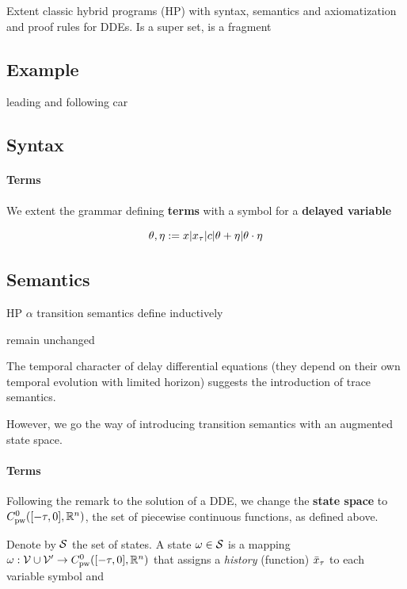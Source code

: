 \documentclass[10pt]{article}
\begin{document}
Extent classic hybrid programs (HP) with syntax, semantics and axiomatization and proof rules for DDEs. Is a super set, \dL is a fragment

\subsection{Example}\label{example-1}

leading and following car

\subsection{Syntax}\label{syntax}

\paragraph{Terms}\label{terms}

We extent the grammar defining \textbf{terms} with a symbol for a \textbf{delayed variable}

\begin{equation} \theta,\eta := x|x_{\tau}|c|\theta+\eta|\theta\cdot\eta \end{equation}

\subsection{Semantics}\label{semantics}

HP $\alpha$ transition semantics define inductively

remain unchanged

The temporal character of delay differential equations (they depend on their own temporal evolution with limited horizon) suggests the introduction of trace semantics.

However, we go the way of introducing transition semantics with an augmented state space.

\paragraph{Terms}\label{terms-1}

Following the remark to the solution of a DDE, we change the \textbf{state space} to $C^0_\text{pw}([-\tau,0],\mathbb{R}^n)$, the set of piecewise continuous functions, as defined above.


Denote by $\mathcal{S}$ the set of states. A state $\omega\in\mathcal{S}$ is a mapping $\omega : \mathcal{V}\cup\mathcal{V'}\rightarrow C^0_\text{pw}([-\tau,0],\mathbb{R}^n)$ that assigns a \emph{history} (function) $\bar{x}_{\tau}$ to each variable symbol and
\end{document}
